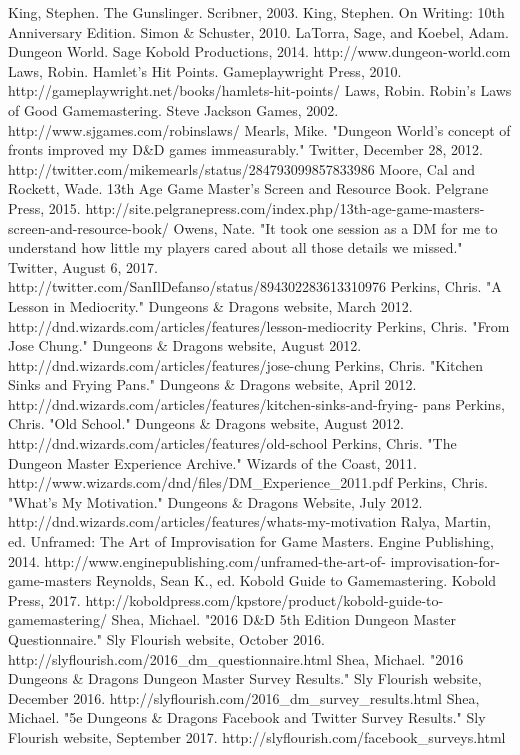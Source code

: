 \documentclass[10pt,a4paper,twoside,bg=print,twocolumn,openany,nodeprecatedcode]{dndbook}
\begin{document}
King, Stephen. The Gunslinger. Scribner, 2003.
King, Stephen. On Writing: 10th Anniversary Edition. Simon \& Schuster, 2010.
LaTorra, Sage, and Koebel, Adam. Dungeon World. Sage Kobold Productions, 2014. http://www.dungeon-world.com
Laws, Robin. Hamlet's Hit Points. Gameplaywright Press, 2010. http://gameplaywright.net/books/hamlets-hit-points/
Laws, Robin. Robin's Laws of Good Gamemastering. Steve Jackson Games, 2002. http://www.sjgames.com/robinslaws/
Mearls, Mike. "Dungeon World's concept of fronts improved my D\&D games immeasurably." Twitter, December 28, 2012. http://twitter.com/mikemearls/status/284793099857833986
Moore, Cal and Rockett, Wade. 13th Age Game Master's Screen and Resource Book. Pelgrane Press, 2015. http://site.pelgranepress.com/index.php/13th-age-game-masters-screen-and-resource-book/
Owens, Nate. "It took one session as a DM for me to understand how little my players cared about all those details we missed." Twitter, August 6, 2017. http://twitter.com/SanIlDefanso/status/894302283613310976
Perkins, Chris. "A Lesson in Mediocrity." Dungeons \& Dragons website, March 2012. http://dnd.wizards.com/articles/features/lesson-mediocrity
Perkins, Chris. "From Jose Chung." Dungeons \& Dragons website, August 2012. http://dnd.wizards.com/articles/features/jose-chung
Perkins, Chris. "Kitchen Sinks and Frying Pans." Dungeons \& Dragons website,
April 2012. http://dnd.wizards.com/articles/features/kitchen-sinks-and-frying-
pans
Perkins, Chris. "Old School." Dungeons \& Dragons website, August 2012. http://dnd.wizards.com/articles/features/old-school
Perkins, Chris. "The Dungeon Master Experience Archive." Wizards of the Coast, 2011. http://www.wizards.com/dnd/files/DM\_Experience\_2011.pdf
Perkins, Chris. "What's My Motivation." Dungeons \& Dragons Website, July 2012. http://dnd.wizards.com/articles/features/whats-my-motivation
Ralya, Martin, ed. Unframed: The Art of Improvisation for Game Masters.
Engine Publishing, 2014. http://www.enginepublishing.com/unframed-the-art-of-
improvisation-for-game-masters
Reynolds, Sean K., ed. Kobold Guide to Gamemastering. Kobold Press, 2017. http://koboldpress.com/kpstore/product/kobold-guide-to-gamemastering/
Shea, Michael. "2016 D\&D 5th Edition Dungeon Master Questionnaire." Sly Flourish website, October 2016. http://slyflourish.com/2016\_dm\_questionnaire.html
Shea, Michael. "2016 Dungeons \& Dragons Dungeon Master Survey Results." Sly Flourish website, December 2016. http://slyflourish.com/2016\_dm\_survey\_results.html
Shea, Michael. "5e Dungeons \& Dragons Facebook and Twitter Survey Results." Sly Flourish website, September 2017. http://slyflourish.com/facebook\_surveys.html
\end{document}
